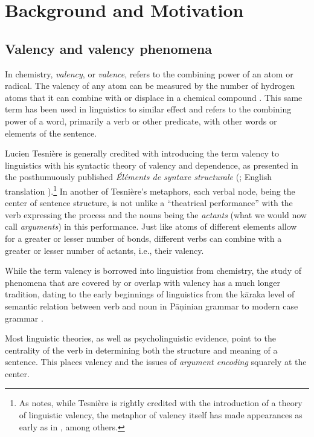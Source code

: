\section{Background and Motivation}

\subsection{Valency and valency phenomena}


In chemistry, \textit{valency}, or \textit{valence}, refers to the combining power of an atom or radical. The valency of any atom can be measured by the number of hydrogen atoms that it can combine with or displace in a chemical compound \citep{law2020a}. This same term has been used in linguistics to similar effect and refers to the combining power of a word, primarily a verb or other predicate, with other words or elements of the sentence. 

Lucien Tesnière is generally credited with introducing the term valency to linguistics with his syntactic theory of valency and dependence, as presented in the posthumuously published \textit{Éléments de syntaxe structurale} (\cite*{tesniere1959}; English translation \cite*{tesniere2015}).\footnote{
    As \citet{przepiorkowski2018} notes, while Tesnière is rightly credited with the introduction of a theory of linguistic valency, the metaphor of valency itself has made appearances as early as in \citet{peirce1897}, among others.
}
In another of Tesnière's metaphors, each verbal node, being the center of sentence structure, is not unlike a ``theatrical performance'' with the verb expressing the process and the nouns being the \textit{actants} (what we would now call \textit{arguments}) in this performance. Just like atoms of different elements allow for a greater or lesser number of bonds, different verbs can combine with a greater or lesser number of actants, i.e., their valency.

While the term valency is borrowed into linguistics from chemistry, the study of phenomena that are covered by or overlap with valency has a much longer tradition, dating to the early beginnings of linguistics from the kāraka level of semantic relation between verb and noun \citep{ganeri2011a} in Pāṇinian grammar to modern case grammar \citep{fillmore1967}. 

Most linguistic theories, as well as psycholinguistic evidence, point to the centrality of the verb in determining both the structure and meaning of a sentence. This places valency and the issues of \textit{argument encoding} squarely at the center.

